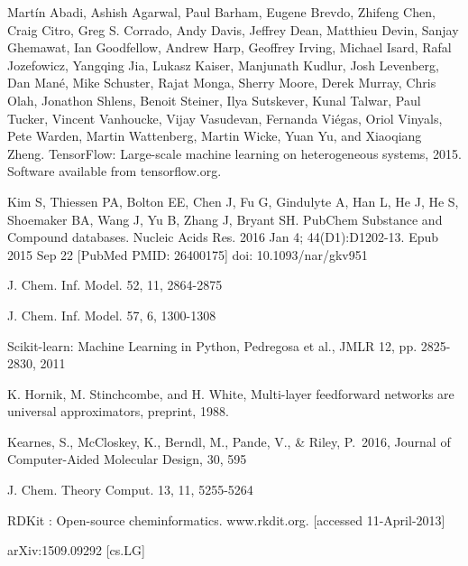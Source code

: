	\begin{thebibliography}{9}

		Martín Abadi, Ashish Agarwal, Paul Barham, Eugene Brevdo,
Zhifeng Chen, Craig Citro, Greg S. Corrado, Andy Davis,
Jeffrey Dean, Matthieu Devin, Sanjay Ghemawat, Ian Goodfellow,
Andrew Harp, Geoffrey Irving, Michael Isard, Rafal Jozefowicz, Yangqing Jia,
Lukasz Kaiser, Manjunath Kudlur, Josh Levenberg, Dan Mané, Mike Schuster,
Rajat Monga, Sherry Moore, Derek Murray, Chris Olah, Jonathon Shlens,
Benoit Steiner, Ilya Sutskever, Kunal Talwar, Paul Tucker,
Vincent Vanhoucke, Vijay Vasudevan, Fernanda Viégas,
Oriol Vinyals, Pete Warden, Martin Wattenberg, Martin Wicke,
Yuan Yu, and Xiaoqiang Zheng.
TensorFlow: Large-scale machine learning on heterogeneous systems,
2015. Software available from tensorflow.org.

		Kim S, Thiessen PA, Bolton EE, Chen J, Fu G, Gindulyte A, Han L, He J, He S, Shoemaker BA, Wang J, Yu B, Zhang J, Bryant SH. PubChem Substance and Compound databases. Nucleic Acids Res. 2016 Jan 4; 44(D1):D1202-13. Epub 2015 Sep 22 [PubMed PMID: 26400175] doi: 10.1093/nar/gkv951
		
		J. Chem. Inf. Model.  52, 11, 2864-2875		

		J. Chem. Inf. Model.  57, 6, 1300-1308

		Scikit-learn: Machine Learning in Python, Pedregosa et al., JMLR 12, pp. 2825-2830, 2011

		K. Hornik, M. Stinchcombe, and H. White, Multi-layer feedforward networks are universal 	approximators, preprint, 1988. 
		
	 Kearnes, S., McCloskey, K., Berndl, M., Pande, V., \& Riley, P.\ 2016, Journal of Computer-Aided Molecular Design, 30, 595 
	
		J. Chem. Theory Comput.  13, 11, 5255-5264
	
	 RDKit : Open-source cheminformatics. www.rkdit.org. [accessed 11-April-2013]
	
		arXiv:1509.09292 [cs.LG]
	
	

	
          
\end{thebibliography}